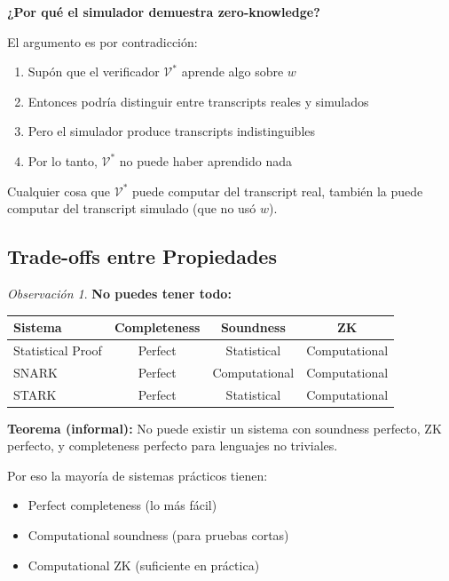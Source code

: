 \documentclass[11pt,a4paper,twoside,openright]{book}
\theoremstyle{definition}
\theoremstyle{plain}
\theoremstyle{remark}
\newtheorem{remark}{Observación}[chapter]
\begin{document}
\begin{keyidea}
\textbf{¿Por qué el simulador demuestra zero-knowledge?}

El argumento es por contradicción:
\begin{enumerate}
    \item Supón que el verificador $\mathcal{V}^*$ aprende algo sobre $w$
    \item Entonces podría distinguir entre transcripts reales y simulados
    \item Pero el simulador produce transcripts indistinguibles
    \item Por lo tanto, $\mathcal{V}^*$ no puede haber aprendido nada
\end{enumerate}

Cualquier cosa que $\mathcal{V}^*$ puede computar del transcript real, también la puede computar del transcript simulado (que no usó $w$).
\end{keyidea}

\subsection{Trade-offs entre Propiedades}

\begin{remark}
\textbf{No puedes tener todo:}

\begin{center}
\begin{tabular}{lccc}
\toprule
\textbf{Sistema} & \textbf{Completeness} & \textbf{Soundness} & \textbf{ZK} \\
\midrule
Statistical Proof & Perfect & Statistical & Computational \\
SNARK & Perfect & Computational & Computational \\
STARK & Perfect & Statistical & Computational \\
\bottomrule
\end{tabular}
\end{center}

\textbf{Teorema (informal):} No puede existir un sistema con soundness perfecto, ZK perfecto, y completeness perfecto para lenguajes no triviales.

Por eso la mayoría de sistemas prácticos tienen:
\begin{itemize}
    \item Perfect completeness (lo más fácil)
    \item Computational soundness (para pruebas cortas)
    \item Computational ZK (suficiente en práctica)
\end{itemize}
\end{remark}
\end{document}
